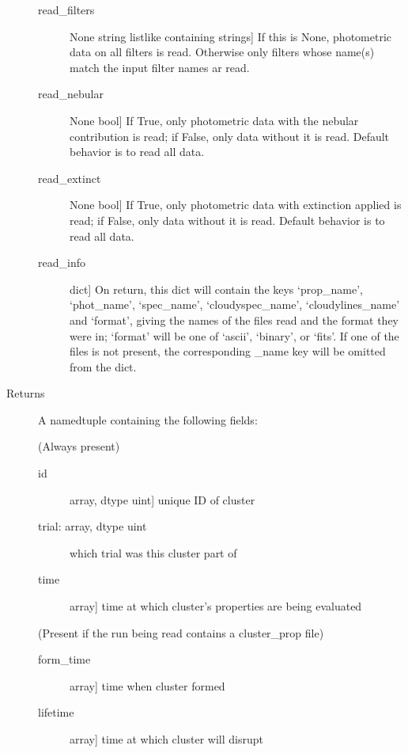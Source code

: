 \documentclass[letterpaper,10pt,english]{sphinxmanual}
\begin{document}
\begin{fulllineitems}
\begin{description}
\begin{description}
\item[{read\_filters}] \leavevmode{[}None \textbar{} string \textbar{} listlike containing strings{]}
If this is None, photometric data on all filters is
read. Otherwise only filters whose name(s) match the input
filter names ar read.

\item[{read\_nebular}] \leavevmode{[}None \textbar{} bool{]}
If True, only photometric data with the nebular contribution
is read; if False, only data without it is read. Default
behavior is to read all data.

\item[{read\_extinct}] \leavevmode{[}None \textbar{} bool{]}
If True, only photometric data with extinction applied is
read; if False, only data without it is read. Default
behavior is to read all data.

\item[{read\_info}] \leavevmode{[}dict{]}
On return, this dict will contain the keys `prop\_name',
`phot\_name', `spec\_name', `cloudyspec\_name', `cloudylines\_name'
and `format', giving the names of the files read and the format
they were in; `format' will be one of `ascii', `binary', or
`fits'. If one of the files is not present, the corresponding
\_name key will be omitted from the dict.

\end{description}

\item[{Returns}] \leavevmode
A namedtuple containing the following fields:

(Always present)
\begin{description}
\item[{id}] \leavevmode{[}array, dtype uint{]}
unique ID of cluster

\item[{trial: array, dtype uint}] \leavevmode
which trial was this cluster part of

\item[{time}] \leavevmode{[}array{]}
time at which cluster's properties are being evaluated

\end{description}

(Present if the run being read contains a cluster\_prop file)
\begin{description}
\item[{form\_time}] \leavevmode{[}array{]}
time when cluster formed

\item[{lifetime}] \leavevmode{[}array{]}
time at which cluster will disrupt


\end{description}
\end{description}
\end{fulllineitems}
\end{document}

